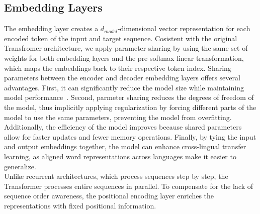 \subsection{Embedding Layers} 
The embedding layer creates a \texttt{$d_{model}$}-dimensional vector representation for each encoded token of the input and target sequence. 
Cosistent with the original Transfromer architecture, we apply parameter sharing by using the same set of weights for both embedding layers and the pre-softmax linear transformation, which maps the embeddings back to their respective token index.
Sharing parameters between the encoder and decoder embedding layers offers several advantages.
First, it can significantly reduce the model size while maintaining model performance~\cite{press2017usingoutputembeddingimprove}.
Second, parmeter sharing reduces the degrees of freedom of the model, thus implicitly applying regularization by forcing different parts of the model to use the same parameters, preventing the model from overfitting.
Additionally, the efficiency of the model improves because shared parameters allow for faster updates and fewer memory operations.
Finally, by tying the input and output embeddings together, the model can enhance cross-lingual transfer learning, as aligned word representations across languages make it easier to generalize. \\
Unlike recurrent architectures, which process sequences step by step, the Transformer processes entire sequences in parallel. 
To compensate for the lack of sequence order awareness, the positional encoding layer enriches the representations with fixed positional information.  \\

